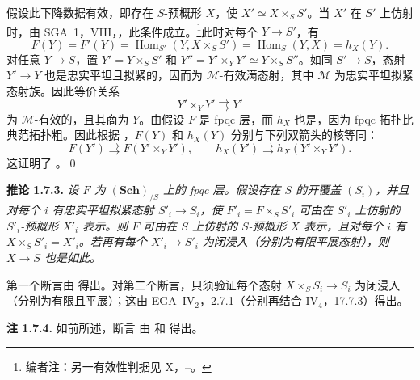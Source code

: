 假设此下降数据有效，即存在 \(S\)-预概形 \(X\)，使 \(X'\simeq X\times_SS'\)。当 \(X'\) 在 \(S'\) 上仿射时，由 SGA~1，VIII，，此条件成立。\footnote{编者注：另一有效性判据见 X，--。}此时对每个 \(Y\to S'\)，有
\begin{equation}
  \tag{\(\ast\ast\)}
  F(Y)=F'(Y)
  =\operatorname{Hom}_{S'}(Y,X\times_SS')
  =\operatorname{Hom}_S(Y,X)=h_X(Y).
\end{equation}
对任意 \(Y\to S\)，置 \(Y'=Y\times_SS'\) 和 \(Y''=Y'\times_YY'\simeq Y\times_SS''\)。如同 \(S'\to S\)，态射 \(Y'\to Y\) 也是忠实平坦且拟紧的，因而为 \(\mathcal M\)-有效满态射，其中 \(\mathcal M\) 为忠实平坦拟紧态射族。因此等价关系
\[
  Y'\times_YY'\rightrightarrows Y'
\]
为 \(\mathcal M\)-有效的，且其商为 \(Y\)。由假设 \(F\) 是 fpqc 层，而 \(h_X\) 也是，因为 fpqc 拓扑比典范拓扑粗。因此根据 ，\(F(Y)\) 和 \(h_X(Y)\) 分别与下列双箭头的核等同：
\[
  F(Y')\rightrightarrows F(Y'\times_YY'),
  \qquad
  h_X(Y')\rightrightarrows h_X(Y'\times_YY').
\]
这证明了 。\qed

\medskip
\noindent{}\textbf{推论 1.7.3.}
\textit{设 \(F\) 为 \((\mathbf{Sch})_{/S}\) 上的 fpqc 层。假设存在 \(S\) 的开覆盖 \((S_i)\)，并且对每个 \(i\) 有忠实平坦拟紧态射 \(S'_i\to S_i\)，使 \(F'_i=F\times_SS'_i\) 可由在 \(S'_i\) 上仿射的 \(S'_i\)-预概形 \(X'_i\) 表示。则 \(F\) 可由在 \(S\) 上仿射的 \(S\)-预概形 \(X\) 表示，且对每个 \(i\) 有 \(X\times_SS'_i=X'_i\)。若再有每个 \(X'_i\to S'_i\) 为闭浸入（分别为有限平展态射），则 \(X\to S\) 也是如此。}

第一个断言由  得出。对第二个断言，只须验证每个态射 \(X\times_SS_i\to S_i\) 为闭浸入（分别为有限且平展）；这由 EGA~IV\(_2\)，2.7.1（分别再结合 IV\(_4\)，17.7.3）得出。

\medskip
\noindent{}\textbf{注 1.7.4.}
如前所述，断言  由  和  得出。
